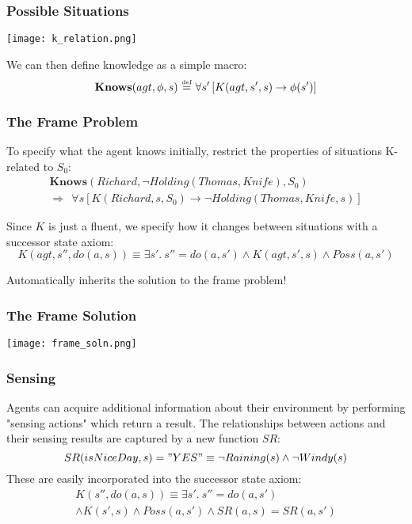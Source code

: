 \documentclass{beamer}
\newcommand{\isdef}{\hbox{$\stackrel{\mbox{\tiny def}}{=}$}}
\begin{document}
\begin{frame}
\frametitle{Possible Situations}
\begin{center}
  \texttt{[image: k\_relation.png]}
\end{center}

We can then define knowledge as a simple macro:
\[ \mathbf{Knows}(agt,\phi,s)\ \isdef\ \forall s'\left[K(agt,s',s)\rightarrow \phi(s')\right] \]
\end{frame}

\begin{frame}
\frametitle{The Frame Problem}
To specify what the agent knows initially, restrict the properties of situations
K-related to $S_0$:
\begin{gather*}
  \mathbf{Knows}(Richard,\neg Holding(Thomas,Knife),S_0) \\
  \Rightarrow \ \ \forall s \left[K(Richard,s,S_0) \rightarrow \neg Holding(Thomas,Knife,s) \right]
\end{gather*}

\pause
Since $K$ is just a fluent, we specify how it changes  between situations
with a successor state axiom:
\begin{equation*}
 K(agt,s'',do(a,s)) \equiv \exists s' . \ s''=do(a,s')
 \wedge K(agt,s',s) \wedge Poss(a,s')
\end{equation*}

Automatically inherits the solution to the frame problem!
\end{frame}

\begin{frame}
\frametitle{The Frame Solution}
\begin{center}
  \texttt{[image: frame\_soln.png]}
\end{center}
\end{frame}

\begin{frame}
\frametitle{Sensing}
Agents can acquire additional information about their environment by performing
"sensing actions" which return a result.  The relationships between actions
and their sensing results are captured by a new function $SR$:
\begin{equation*}
SR(isNiceDay,s) = "YES" \equiv \neg Raining(s) \wedge \neg Windy(s)
\end{equation*}
These are easily incorporated into the successor state axiom:
\begin{multline*}
 K(s'',do(a,s)) \equiv \exists s' . \ s''=do(a,s') \\
 \wedge K(s',s) \wedge Poss(a,s') \wedge SR(a,s) = SR(a,s')
\end{multline*}
\end{frame}
\end{document}
